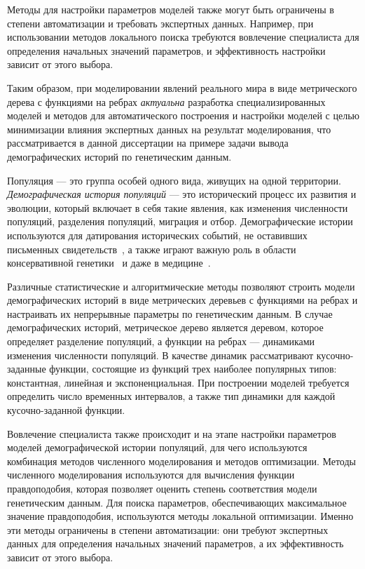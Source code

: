 Методы для настройки параметров моделей также могут быть ограничены в степени автоматизации и требовать экспертных данных.
Например, при использовании методов локального поиска требуются вовлечение специалиста для определения начальных значений параметров, и эффективность настройки зависит от этого выбора.

\newpage
Таким образом, при моделировании явлений реального мира в виде метрического дерева с функциями на ребрах \textit{актуальна} разработка специализированных моделей и методов для автоматического построения и настройки моделей с целью минимизации влияния экспертных данных на результат моделирования, что рассматривается в данной диссертации на примере задачи вывода демографических историй по генетическим данным.

Популяция --- это группа особей одного вида, живущих на одной территории.
\textit{Демографическая история популяций} --- это исторический процесс их развития и эволюции, который включает в себя такие явления, как изменения численности популяций, разделения популяций, миграция и отбор.
Демографические истории используются для датирования исторических событий, не оставивших письменных свидетельств~\cite{goebel2008late,mellars2006going}, а также играют важную роль в области консервативной генетики~\cite{nikolic2022stepping} и даже в медицине~\cite{nielsen2007recent}.

Различные статистические и алгоритмические методы позволяют строить модели демографических историй в виде метрических деревьев с функциями на ребрах и настраивать их непрерывные параметры по генетическим данным.
В случае демографических историй, метрическое дерево является деревом, которое определяет разделение популяций, а функции на ребрах — динамиками изменения численности популяций.
В качестве динамик рассматривают кусочно-заданные функции, состоящие из функций трех наиболее популярных типов: константная, линейная и экспоненциальная.
При построении моделей требуется определить число временных интервалов, а также тип динамики для каждой кусочно-заданной функции.

Вовлечение специалиста также происходит и на этапе настройки параметров моделей демографической истории популяций, для чего используются комбинация методов численного моделирования и методов оптимизации.
Методы численного моделирования используются для вычисления функции правдоподобия, которая позволяет оценить степень соответствия модели генетическим данным.
Для поиска параметров, обеспечивающих максимальное значение правдоподобия, используются методы локальной оптимизации. Именно эти методы ограничены в степени автоматизации: они требуют экспертных данных для определения начальных значений параметров, а их эффективность зависит от этого выбора.

